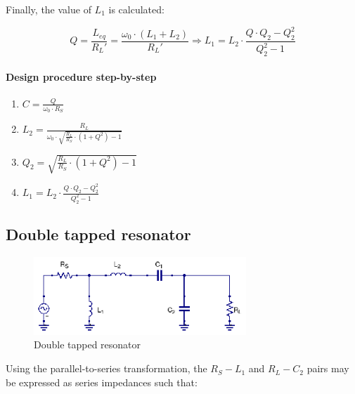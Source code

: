 \noindent Finally, the value of $L_1$ is calculated:

\begin{equation}
Q = \frac{L_{eq}}{R_L'} = \frac{\omega_0 \cdot (L_1 + L_2)}{R_L'} \Longrightarrow L_1 = L_2 \cdot \frac{Q \cdot Q_2 - Q_2^2}{Q_2^2 - 1}
\end{equation}

\paragraph{Design procedure step-by-step}

\begin{enumerate}
  \item $C  = \frac{Q}{\omega_0 \cdot R_S}$
  \item $L_2 = \frac{R_L}{\omega_0 \cdot \sqrt{\frac{R_L}{R_S} \cdot (1 + Q^2) - 1}}$
  \item $Q_2 = \sqrt{\frac{R_L}{R_S} \cdot (1 + Q^2) - 1}$
  \item $L_1 = L_2 \cdot \frac{Q \cdot Q_2 - Q_2^2}{Q_2^2 - 1}$
\end{enumerate}

\subsection{Double tapped resonator}

\begin{figure}[H]
\centering
\includegraphics[width=80mm]{Double-Tapped-Resonator}
\caption{Double tapped resonator}
\label{fig:double-tapped-resonator}
\end{figure}

\noindent Using the parallel-to-series transformation, the $R_S-L_1$ and $R_L-C_2$ pairs may be expressed as series impedances such that:

